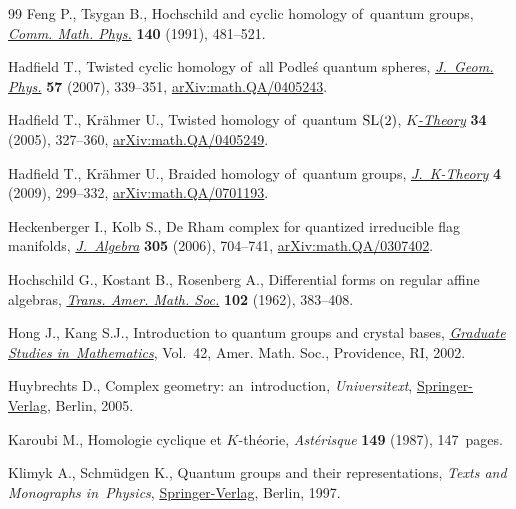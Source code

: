 \documentclass[10pt,a4paper]{amsart}
\numberwithin{equation}{section}
\begin{document}
\begin{thebibliography}{99}
Feng P., Tsygan B., Hoch\-schild and cyclic homology of~quantum groups,
 \href{https://doi.org/doi.org/10.1007/BF02099132}{\textit{Comm. Math. Phys.}} \textbf{140} (1991), 481--521.

Hadfield T., Twisted cyclic homology of~all {P}odle\'{s} quantum spheres,
 \href{https://doi.org/10.1016/j.geomphys.2006.03.006}{\textit{J.~Geom. Phys.}} \textbf{57} (2007), 339--351,
 \href{https://arxiv.org/abs/math.QA/0405243}{arXiv:math.QA/0405243}.

Hadfield T., Kr\"ahmer U., Twisted homology of~quantum {${\rm SL}(2)$},
 \href{https://doi.org/10.1007/s10977-005-3118-2}{\textit{$K$-Theory}} \textbf{34} (2005), 327--360, \href{https://arxiv.org/abs/math.QA/0405249}{arXiv:math.QA/0405249}.

Hadfield T., Kr\"ahmer U., Braided homology of~quantum groups,
 \href{https://doi.org/10.1017/is008008021jkt063}{\textit{J.~K-Theory}} \textbf{4} (2009), 299--332, \href{https://arxiv.org/abs/math.QA/0701193}{arXiv:math.QA/0701193}.

Heckenberger I., Kolb S., De {R}ham complex for quantized irreducible flag
 manifolds, \href{https://doi.org/10.1016/j.jalgebra.2006.02.001}{\textit{J.~Algebra}} \textbf{305} (2006), 704--741,
 \href{https://arxiv.org/abs/math.QA/0307402}{arXiv:math.QA/0307402}.

Hoch\-schild G., Kostant B., Rosenberg A., Differential forms on regular affine
 algebras, \href{https://doi.org/10.2307/1993614}{\textit{Trans. Amer. Math. Soc.}} \textbf{102} (1962), 383--408.

Hong J., Kang S.J., Introduction to quantum groups and crystal bases,
 \href{https://doi.org/10.1090/gsm/042}{\textit{Graduate Studies in~Mathematics}}, Vol.~42, Amer. Math. Soc.,
 Providence, RI, 2002.

Huybrechts D., Complex geometry: an~introduction, \textit{Universitext},
 \href{https://doi.org/10.1007/b137952}{Springer-Verlag}, Berlin, 2005.

Karoubi M., Homologie cyclique et {$K$}-th\'eorie, \textit{Ast\'erisque}
 \textbf{149} (1987), 147~pages.

Klimyk A., Schm\"udgen K., Quantum groups and their representations, \textit{Texts and
 Monographs in~Physics}, \href{https://doi.org/10.1007/978-3-642-60896-4}{Springer-Verlag}, Berlin, 1997.


\end{thebibliography}
\end{document}
